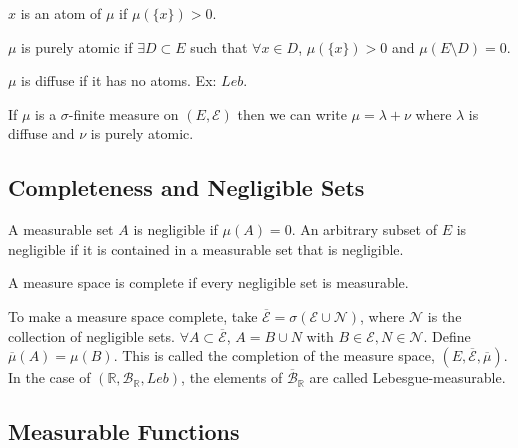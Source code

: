 \documentclass[12pt, titlepage]{article}
\begin{document}
\begin{dfn}[Atom]{}
	$x$ is an atom of $\mu$ if $\mu(\{x\}) > 0$.
\end{dfn}

\begin{dfn}{}
	$\mu$ is purely atomic if $\exists D \subset E$ such that $\forall x \in D$, $\mu(\{x\}) > 0$ and $\mu(E \setminus D) = 0$.
\end{dfn}

\begin{dfn}{}
	$\mu$ is diffuse if it has no atoms. Ex: $Leb$.
\end{dfn}

\begin{lem}{}
	If $\mu$ is a $\sigma$-finite measure on $(E, \mathcal{E})$ then we can write $\mu = \lambda + \nu$ where $\lambda$ is diffuse and $\nu$ is purely atomic.
\end{lem}

\subsection{Completeness and Negligible Sets}

\begin{dfn}{}
	A measurable set $A$ is negligible if $\mu(A) = 0$. An arbitrary subset of $E$ is negligible if it is contained in a measurable set that is negligible.
\end{dfn}

\begin{dfn}{}
	A measure space is complete if every negligible set is measurable.
\end{dfn}

\begin{lem}[]{}
	To make a measure space complete, take $\overline{\mathcal{E}} = \sigma(\mathcal{E} \cup \mathcal{N})$, where $\mathcal{N}$ is the collection of negligible sets. $\forall A \subset \overline{\mathcal{E}}$, $A = B \cup N$ with $B \in \mathcal{E}, N \in \mathcal{N}$. Define $\overline{\mu}(A) = \mu(B)$. This is called the completion of the measure space, $(E, \overline{\mathcal{E}}, \overline{\mu})$. In the case of $(\mathbb{R}, \mathcal{B}_{\mathbb{R}}, Leb)$, the elements of $\overline{\mathcal{B}}_\mathbb{R}$ are called Lebesgue-measurable.\\
\end{lem}

\subsection{Measurable Functions}
\end{document}
